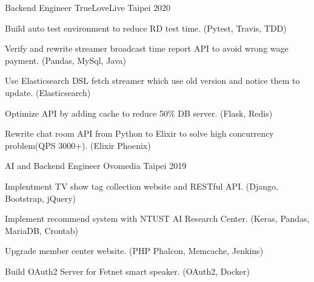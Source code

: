 

\begin{cventries}

  \cventry
    {Backend Engineer} %
    {TrueLoveLive} %
    {Taipei} %
    {2020} %
    {
      \begin{cvitems} %
        \item {Build auto test environment to reduce RD test time. (Pytest, Travis, TDD)}
        \item {Verify and rewrite streamer broadcast time report API to avoid wrong wage payment. (Pandas, MySql, Java)}
        \item {Use Elasticsearch DSL fetch streamer which use old version and notice them to update. (Elasticsearch)}
        \item {Optimize API by adding cache to reduce 50\% DB server. (Flask, Redis)}
        \item {Rewrite chat room API from Python to Elixir to solve high concurrency problem(QPS 3000+). (Elixir Phoenix)}
      \end{cvitems}
    }

  \cventry
    {AI and Backend Engineer} %
    {Ovomedia} %
    {Taipei} %
    {2019} %
    {
      \begin{cvitems} %
        \item {Implentment TV show tag collection website and RESTful API. (Django, Bootstrap, jQuery)}
        \item {Implement recommend system with NTUST AI Research Center. (Keras, Pandas, MariaDB, Crontab)}
        \item {Upgrade member center website. (PHP Phalcon, Memcache, Jenkins)}
        \item {Build OAuth2 Server for Fetnet smart speaker. (OAuth2, Docker)}
      \end{cvitems}
    }

\end{cventries}
